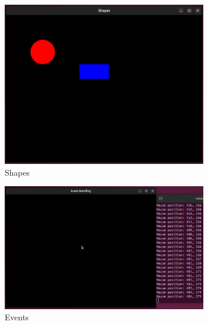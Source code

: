 \begin{figure}[ht]
    \centering
    \includegraphics[width=0.8\textwidth]{src/img/sfml_shapes.png}
    \caption{Shapes}
    \label{fig:shapes}
\end{figure}



\begin{figure}[ht]
    \centering
    \includegraphics[width=0.8\textwidth]{src/img/sfml_events.png}
    \caption{Events}
    \label{fig:events}
\end{figure}



